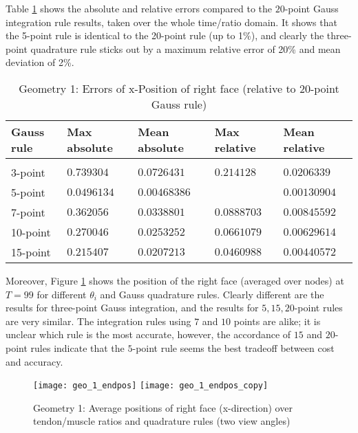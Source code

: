 Table \ref{tab:geo1_errors} shows the absolute and relative errors compared to the $20$-point Gauss integration rule results, taken over the whole time/ratio domain.
It shows that the 5-point rule is identical to the 20-point rule (up to 1\%), and clearly the three-point quadrature rule sticks out by a maximum relative
error of 20\% and mean deviation of 2\%. 
\begin{table}[!htb]
	\centering
	\def\arraystretch{1.3}
	\begin{tabular}{lllll}
		Gauss rule	& Max absolute	& Mean absolute	& Max relative	& Mean relative\\
		\hline\\
		3-point		& $0.739304$	& $0.0726431$	& $0.214128$	& $0.0206339$\\
		5-point		& $0.0496134$	& $0.00468386$	& \red{$0.0136761$}	& $0.00130904$\\
		7-point		& $0.362056$	& $0.0338801$	& $0.0888703$	& $0.00845592$\\
		10-point	& $0.270046$	& $0.0253252$	& $0.0661079$	& $0.00629614$\\
		15-point	& $0.215407$	& $0.0207213$	& $0.0460988$	& $0.00440572$\\
	\end{tabular}
	\caption{Geometry 1: Errors of x-Position of right face (relative to 20-point Gauss rule)}
	\label{tab:geo1_errors}
\end{table}

Moreover, Figure \ref{fig:geo1_endpos} shows the position of the right face (averaged over nodes) at $T=99$ for different $\theta_i$ and Gauss quadrature rules.
Clearly different are the results for three-point Gauss integration, and the results for $5,15,20$-point rules are very similar.
The integration rules using $7$ and $10$ points are alike; it is unclear which rule is the most accurate, however, the accordance of $15$ and $20$-point
rules indicate that the $5$-point rule seems the best tradeoff between cost and accuracy.
\begin{figure}[!ht]
	\texttt{[image: geo\_1\_endpos]}
	\texttt{[image: geo\_1\_endpos\_copy]}
	\caption{Geometry 1: Average positions of right face (x-direction) over tendon/muscle ratios and quadrature rules (two view angles)}
	\label{fig:geo1_endpos}
\end{figure}


